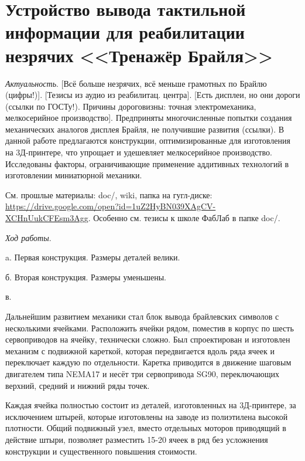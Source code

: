 \documentclass[a4paper,12pt]{article} %
\begin{document}
	
\section{Устройство вывода тактильной информации для реабилитации незрячих <<Тренажёр Брайля>>}

\textit{Актуальность}.
[Всё больше незрячих, всё меньше грамотных по Брайлю (цифры!)]. 
[Тезисы из аудио из реабилитац. центра].
[Есть дисплеи, но они дороги (ссылки по ГОСТу!). Причины дороговизны: точная электромеханика, мелкосерийное производство].
Предприняты многочисленные попытки создания механических аналогов дисплея Брайля, не получившие развития (ссылки). В данной работе предлагаются конструкции, оптимизированные для изготовления на 3Д-принтере, что упрощает и удешевляет мелкосерийное производство. Исследованы факторы, ограничивающие применение аддитивных технологий в изготовлении миниатюрной механики.

См. прошлые материалы: 
doc/, wiki,
папка на гугл-диске: \url{https://drive.google.com/open?id=1uZ2HyBN039XAgCV-XCHnUukCFEsm3Agg}. 
Особенно см. тезисы к школе ФабЛаб в папке doc/.

\textit{Ход работы}.

a. Первая конструкция. Размеры деталей велики.

б. Вторая конструкция. Размеры уменьшены.

в.

Дальнейшим развитием механики стал блок вывода брайлевских символов с несколькими ячейками. Расположить ячейки рядом, поместив в корпус по шесть сервоприводов на ячейку, технически сложно. Был спроектирован и изготовлен механизм с подвижной кареткой, которая передвигается вдоль ряда ячеек и переключает каждую по отдельности. Каретка приводится в движение шаговым двигателем типа NEMA17 и несёт три сервопривода SG90, переключающих верхний, средний и нижний ряды точек.

Каждая ячейка полностью состоит из деталей, изготовленных на 3Д\--\-прин\-тере, за исключением штырей, которые изготовлены на заводе из полиэтилена высокой плотности. Общий подвижный узел, вместо отдельных моторов приводящий в действие штыри, позволяет разместить 15-20 ячеек в ряд без усложнения конструкции и существенного повышения стоимости.
\end{document}
